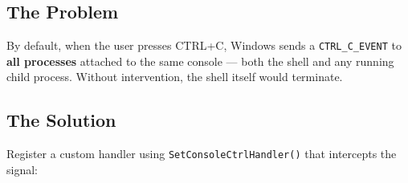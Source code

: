 \documentclass[12pt,a4paper]{article}
\begin{document}
\subsection{The Problem}

By default, when the user presses CTRL+C, Windows sends a \texttt{CTRL\_C\_EVENT} to \textbf{all processes} attached to the same console --- both the shell and any running child process. Without intervention, the shell itself would terminate.

\subsection{The Solution}

Register a custom handler using \texttt{SetConsoleCtrlHandler()} that intercepts the signal:
\end{document}
